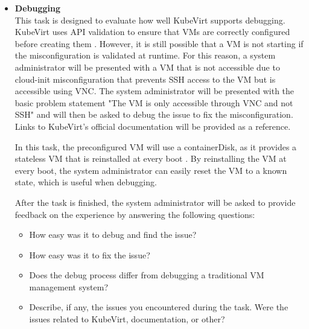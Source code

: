 \documentclass{article}
\begin{document}
\begin{itemize}
    In this task, the preconfigured VM will use a containerDisk, as it provides a stateless VM that is reinstalled at every boot \cite{kubevirt-docs-disks}. By reinstalling the VM at every boot, the system administrator can easily reset the VM to a known state, which prevents any issues related to the VM's state.

    After the task is finished, the system administrator will be asked to provide feedback on the experience by answering the following questions:
    \begin{itemize}
        \item How straightforward was it to create and restore a snapshot of a VM?
        \item How intuitive was the process of migrating a VM from one node to another?
        \item Describe, if any, the issues you encountered during the task. Were the issues related to KubeVirt, documentation, or other?
    \end{itemize}

    \item\textbf{Debugging}\\
    This task is designed to evaluate how well KubeVirt supports debugging. KubeVirt uses API validation to ensure that VMs are correctly configured before creating them \cite{kubevirt-docs-validation}. However, it is still possible that a VM is not starting if the misconfiguration is validated at runtime. For this reason, a system administrator will be presented with a VM that is not accessible due to cloud-init misconfiguration that prevents SSH access to the VM but is accessible using VNC. The system administrator will be presented with the basic problem statement "The VM is only accessible through VNC and not SSH" and will then be asked to debug the issue to fix the misconfiguration. Links to KubeVirt's official documentation will be provided as a reference.

    In this task, the preconfigured VM will use a containerDisk, as it provides a stateless VM that is reinstalled at every boot \cite{kubevirt-docs-disks}. By reinstalling the VM at every boot, the system administrator can easily reset the VM to a known state, which is useful when debugging.
    
    After the task is finished, the system administrator will be asked to provide feedback on the experience by answering the following questions:
    \begin{itemize}
        \item How easy was it to debug and find the issue?
        \item How easy was it to fix the issue?
        \item Does the debug process differ from debugging a traditional VM management system?
        \item Describe, if any, the issues you encountered during the task. Were the issues related to KubeVirt, documentation, or other?
    \end{itemize}    
\end{itemize}
\end{document}

